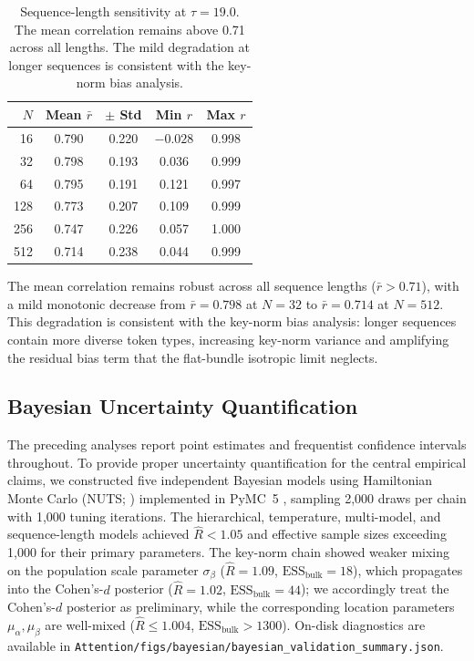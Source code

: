 \documentclass[twoside,11pt]{article}
\begin{document}
\begin{table}[h]
\centering
\renewcommand{\arraystretch}{1.15}
\begin{tabular}{rcccc}
\hline
$N$ & Mean $\bar{r}$ & $\pm$ Std & Min $r$ & Max $r$ \\
\hline
16 & 0.790 & 0.220 & $-0.028$ & 0.998 \\
32 & 0.798 & 0.193 & 0.036 & 0.999 \\
64 & 0.795 & 0.191 & 0.121 & 0.997 \\
128 & 0.773 & 0.207 & 0.109 & 0.999 \\
256 & 0.747 & 0.226 & 0.057 & 1.000 \\
512 & 0.714 & 0.238 & 0.044 & 0.999 \\
\hline
\end{tabular}
\caption{Sequence-length sensitivity at $\tau = 19.0$. The mean correlation remains above 0.71 across all lengths. The mild degradation at longer sequences is consistent with the key-norm bias analysis.}
\label{tab:seqlen_supp}
\end{table}

The mean correlation remains robust across all sequence lengths ($\bar{r} > 0.71$), with a mild monotonic decrease from $\bar{r} = 0.798$ at $N = 32$ to $\bar{r} = 0.714$ at $N = 512$. This degradation is consistent with the key-norm bias analysis: longer sequences contain more diverse token types, increasing key-norm variance and amplifying the residual bias term that the flat-bundle isotropic limit neglects.

\subsection{Bayesian Uncertainty Quantification}
\label{sec:bayesian_validation_supp}

The preceding analyses report point estimates and frequentist confidence intervals throughout. To provide proper uncertainty quantification for the central empirical claims, we constructed five independent Bayesian models using Hamiltonian Monte Carlo (NUTS; \citealp{hoffman2014no}) implemented in PyMC~5 \citep{salvatier2016probabilistic}, sampling 2{,}000 draws per chain with 1{,}000 tuning iterations. The hierarchical, temperature, multi-model, and sequence-length models achieved $\hat{R} < 1.05$ and effective sample sizes exceeding 1{,}000 for their primary parameters. The key-norm chain showed weaker mixing on the population scale parameter $\sigma_\beta$ ($\hat{R} = 1.09$, $\mathrm{ESS}_{\mathrm{bulk}} = 18$), which propagates into the Cohen's-$d$ posterior ($\hat{R} = 1.02$, $\mathrm{ESS}_{\mathrm{bulk}} = 44$); we accordingly treat the Cohen's-$d$ posterior as preliminary, while the corresponding location parameters $\mu_\alpha, \mu_\beta$ are well-mixed ($\hat{R} \le 1.004$, $\mathrm{ESS}_{\mathrm{bulk}} > 1300$). On-disk diagnostics are available in \texttt{Attention/figs/bayesian/bayesian\_validation\_summary.json}.
\end{document}

